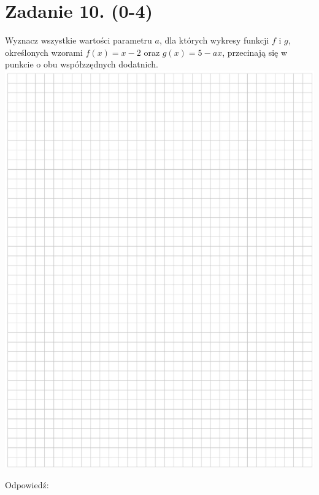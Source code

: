 \documentclass[10pt]{article}
\begin{document}
\section*{Zadanie 10. (0-4)}
Wyznacz wszystkie wartości parametru \(a\), dla których wykresy funkcji \(f\) i \(g\), określonych wzorami \(f(x)=x-2\) oraz \(g(x)=5-a x\), przecinają się w punkcie o obu współzzędnych dodatnich.\\
\includegraphics[max width=\textwidth, center]{2024_11_21_054c332d5c02f869c372g-10}

Odpowiedź: \(\qquad\)
\end{document}
